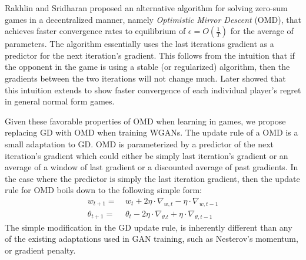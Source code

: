 Rakhlin and Sridharan \citep{Rakhlin} proposed an alternative algorithm for solving zero-sum games in a decentralized manner, namely  \emph{Optimistic Mirror Descent} (OMD), that achieves faster convergence rates to equilibrium of $\epsilon = O\left(\frac{1}{T}\right)$ for the average of parameters. The algorithm essentially uses the last iterations gradient as a predictor for the next iteration's gradient. This follows from the intuition that if the opponent in the game is using a stable (or regularized) algorithm, then the gradients between the two iterations will not change much. Later \cite{Syrgkanis} showed that this intuition extends to show faster convergence of each individual player's regret in general normal form games. 

Given these favorable properties of OMD when learning in games, we propose replacing GD with OMD when training WGANs. The update rule of a OMD is a small adaptation to GD. OMD is parameterized by a predictor of the next iteration's gradient which could either be simply last iteration's gradient or an average of a window of last gradient or a discounted average of past gradients. In the case where the predictor is simply the last iteration gradient, then the update rule for OMD boils down to the following simple form:
\begin{equation}\label{eqn:omd}
\begin{aligned}
w_{t+1} =~& w_t + 2\eta \cdot \nabla_{w, t} - \eta \cdot \nabla_{w, t-1} \\
\theta_{t+1} =~& \theta_t - 2 \eta \cdot \nabla_{\theta. t}
+ \eta \cdot \nabla_{\theta, t-1}
\end{aligned}
\end{equation}
The simple modification in the GD update rule, is inherently different than any of the existing adaptations used in GAN training, such as Nesterov's momentum, or gradient penalty.

